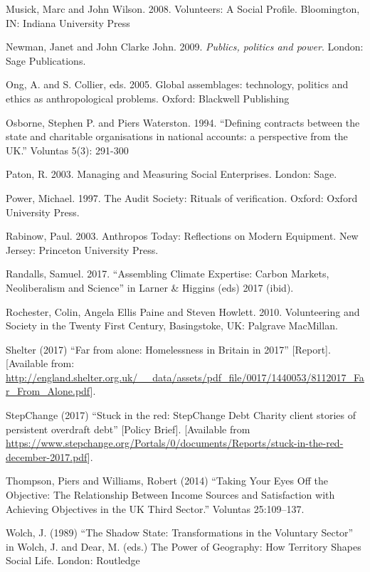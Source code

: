 \begin{thebibliography}{99}
\item Musick, Marc and John Wilson. 2008. Volunteers: A Social Profile. Bloomington, IN: Indiana University Press
\item Newman, Janet and John Clarke John. 2009. \textit{Publics, politics and power}. London: Sage Publications.
\item Ong, A. and S. Collier, eds. 2005. Global assemblages: technology, politics and ethics as anthropological problems.  Oxford: Blackwell Publishing
\item Osborne, Stephen P.  and Piers Waterston. 1994. “Defining contracts between the state and charitable organisations in national accounts: a perspective from the UK.” Voluntas 5(3): 291-300
\item Paton, R. 2003. Managing and Measuring Social Enterprises. London: Sage.
\item Power, Michael. 1997. The Audit Society: Rituals of verification. Oxford: Oxford University Press.
\item Rabinow, Paul. 2003. Anthropos Today: Reflections on Modern Equipment. New Jersey: Princeton University Press.
\item Randalls, Samuel. 2017. “Assembling Climate Expertise: Carbon Markets, Neoliberalism and Science” in Larner \& Higgins (eds) 2017 (ibid).
\item Rochester, Colin, Angela Ellis Paine and Steven Howlett. 2010. Volunteering and Society in the Twenty First Century, Basingstoke, UK: Palgrave MacMillan.
\item Shelter (2017) “Far from alone: Homelessness in Britain in 2017” [Report]. [Available from: \url{http://england.shelter.org.uk/__data/assets/pdf_file/0017/1440053/8112017_Far_From_Alone.pdf}].
\item StepChange (2017) “Stuck in the red: StepChange Debt Charity client stories of persistent overdraft debt” [Policy Brief]. [Available from \url{https://www.stepchange.org/Portals/0/documents/Reports/stuck-in-the-red-december-2017.pdf}].
\item Thompson, Piers and Williams, Robert (2014) “Taking Your Eyes Off the Objective: The Relationship Between Income Sources and Satisfaction with Achieving Objectives in the UK Third Sector.” Voluntas 25:109–137.
\item Wolch, J. (1989) “The Shadow State: Transformations in the Voluntary Sector” in Wolch, J. and Dear, M. (eds.) The Power of Geography: How Territory Shapes Social Life. London: Routledge

\end{thebibliography}